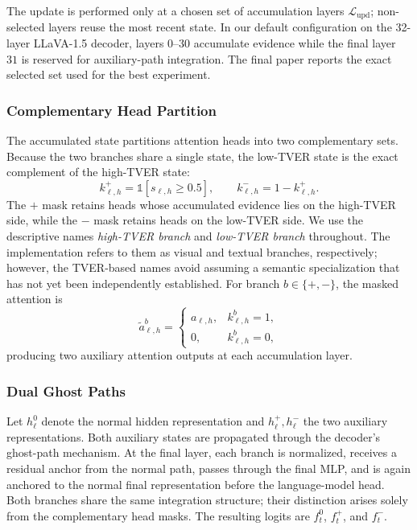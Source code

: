 The update is performed only at a chosen set of accumulation layers $\mathcal{L}_{\mathrm{upd}}$; non-selected layers reuse the most recent state. In our default configuration on the 32-layer LLaVA-1.5 decoder, layers $0$--$30$ accumulate evidence while the final layer~$31$ is reserved for auxiliary-path integration. The final paper reports the exact selected set used for the best experiment.

\subsubsection{Complementary Head Partition}

The accumulated state partitions attention heads into two complementary sets. Because the two branches share a single state, the low-TVER state is the exact complement of the high-TVER state:
\begin{equation}
k_{\ell,h}^{+} = \mathbb{1}\!\left[s_{\ell,h} \geq 0.5\right], \qquad k_{\ell,h}^{-} = 1 - k_{\ell,h}^{+}.
\end{equation}
The $+$ mask retains heads whose accumulated evidence lies on the high-TVER side, while the $-$ mask retains heads on the low-TVER side. We use the descriptive names \emph{high-TVER branch} and \emph{low-TVER branch} throughout. The implementation refers to them as visual and textual branches, respectively; however, the TVER-based names avoid assuming a semantic specialization that has not yet been independently established. For branch $b \in \{+,-\}$, the masked attention is
\begin{equation}
\tilde{a}_{\ell,h}^{b} =
\begin{cases}
a_{\ell,h}, & k_{\ell,h}^{b} = 1, \\
0, & k_{\ell,h}^{b} = 0,
\end{cases}
\end{equation}
producing two auxiliary attention outputs at each accumulation layer.

\subsubsection{Dual Ghost Paths}

Let $h_{\ell}^{0}$ denote the normal hidden representation and $h_{\ell}^{+}, h_{\ell}^{-}$ the two auxiliary representations. Both auxiliary states are propagated through the decoder's ghost-path mechanism. At the final layer, each branch is normalized, receives a residual anchor from the normal path, passes through the final MLP, and is again anchored to the normal final representation before the language-model head. Both branches share the same integration structure; their distinction arises solely from the complementary head masks. The resulting logits are $f_t^{0}$, $f_t^{+}$, and $f_t^{-}$.

